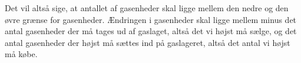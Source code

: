Det vil altså sige, at antallet af gasenheder skal ligge mellem den nedre og den øvre grænse for gasenheder. Ændringen i gasenheder skal ligge mellem minus det antal gasenheder der må tages ud af gaslaget, altså det vi højst må sælge, og det antal gasenheder der højst må sættes ind på gaslageret, altså det antal vi højst må købe.


